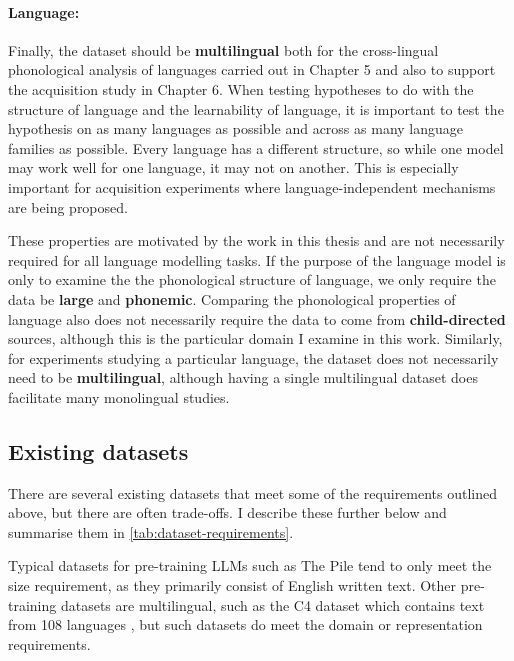 \paragraph{Language:} Finally, the dataset should be \textbf{multilingual} both for the cross-lingual phonological analysis of languages carried out in Chapter 5 and also to support the acquisition study in Chapter 6. When testing hypotheses to do with the structure of language and the learnability of language, it is important to test the hypothesis on as many languages as possible and across as many language families as possible. Every language has a different structure, so while one model may work well for one language, it may not on another. This is especially important for acquisition experiments where language-independent mechanisms are being proposed. 

These properties are motivated by the work in this thesis and are not necessarily required for all language modelling tasks. If the purpose of the language model is only to examine the the phonological structure of language, we only require the data be \textbf{large} and \textbf{phonemic}. Comparing the phonological properties of language also does not necessarily require the data to come from \textbf{child-directed} sources, although this is the particular domain I examine in this work. Similarly, for experiments studying a particular language, the dataset does not necessarily need to be \textbf{multilingual}, although having a single multilingual dataset does facilitate many monolingual studies.

\subsection{Existing datasets}
\label{sec:dataset-existing}

There are several existing datasets that meet some of the requirements outlined above, but there are often trade-offs. I describe these further below and summarise them in \cref{tab:dataset-requirements}.

Typical datasets for pre-training LLMs such as The Pile tend to only meet the size requirement, as they primarily consist of English written text. Other pre-training datasets are multilingual, such as the C4 dataset which contains text from 108 languages \citep{raffel2020exploring}, but such datasets do meet the domain or representation requirements.

